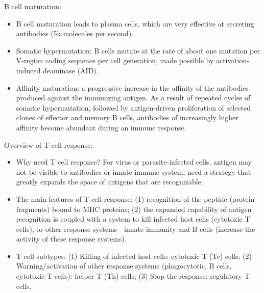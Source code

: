 \documentclass{report}
\begin{document}
B cell maturation: 
\begin{itemize}
	\item B cell maturation leads to plasma cells, which are very effective at secreting antibodies (5k molecules per second).
	\item Somatic hypermutation: B cells mutate at the rate of about one mutation per V-region coding sequence per cell generation, made possible by activation-induced deaminase (AID).
	\item Affinity maturation: a progressive increase in the affinity of the antibodies produced against the immunizing antigen. As a result of repeated cycles of somatic hypermutation, followed by antigen-driven proliferation of selected clones of effector and memory B cells, antibodies of increasingly higher affinity become abundant during an immune response. 
\end{itemize}

Overview of T-cell response: 
\begin{itemize}
	\item Why need T cell response? For virus or parasite-infected cells, antigen may not be visible to antibodies or innate immune system, need a strategy that greatly expands the space of antigens that are recognizable.  
	\item The main features of T-cell response: (1) recognition of the peptide (protein fragments) bound to MHC proteins; (2) the expanded capability of antigen recognition is coupled with a system to kill infected host cells (cytotoxic T cells), or other response systems - innate immunity and B cells (increase the activity of these response systems).
	\item T cell subtypes: (1) Killing of infected host cells: cytotoxic T (Tc) cells; (2) Warning/activation of other response systems (phagocytotic, B cells, cytotoxic T cells): helper T (Th) cells; (3) Stop the response: regulatory T cells. 
\end{itemize}
\end{document}
